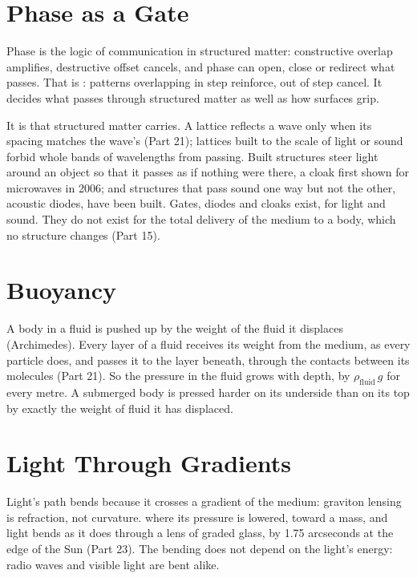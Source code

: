 \documentclass[11pt,a4paper]{article}
\begin{document}
\section{Phase as a Gate}

Phase is the logic of communication in structured matter: constructive overlap amplifies, destructive offset cancels, and phase can open, close or redirect what passes. That is : patterns overlapping in step reinforce, out of step cancel. It decides what passes through structured matter as well as how surfaces grip.

It is  that structured matter carries. A lattice reflects a wave only when its spacing matches the wave's (Part 21); lattices built to the scale of light or sound forbid whole bands of wavelengths from passing. Built structures steer light around an object so that it passes as if nothing were there, a cloak first shown for microwaves in 2006; and structures that pass sound one way but not the other, acoustic diodes, have been built. Gates, diodes and cloaks exist, for light and sound. They do not exist for the total delivery of the medium to a body, which no structure changes (Part 15).

\section{Buoyancy}

A body in a fluid is pushed up by the weight of the fluid it displaces (Archimedes).  Every layer of a fluid receives its weight from the medium, as every particle does, and passes it to the layer beneath, through the contacts between its molecules (Part 21). So the pressure in the fluid grows with depth, by $\rho_{\text{fluid}}\,g$ for every metre. A submerged body is pressed harder on its underside than on its top by exactly the weight of fluid it has displaced.

\section{Light Through Gradients}

Light's path bends because it crosses a gradient of the medium: graviton lensing is refraction, not curvature.  where its pressure is lowered, toward a mass, and light bends as it does through a lens of graded glass, by 1.75 arcseconds at the edge of the Sun (Part 23). The bending does not depend on the light's energy: radio waves and visible light are bent alike.
\end{document}
